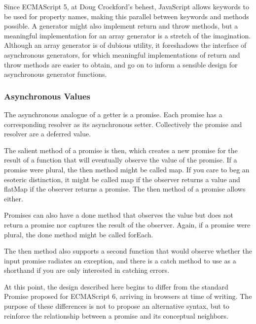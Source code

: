Since ECMAScript 5, at Doug Crockford’s behest, JavaScript allows keywords to be used for property names, making this parallel between keywords and methods possible. A generator might also implement return and throw methods, but a meaningful implementation for an array generator is a stretch of the imagination. Although an array generator is of dubious utility, it foreshadows the interface of asynchronous generators, for which meaningful implementations of return and throw methods are easier to obtain, and go on to inform a sensible design for asynchronous generator functions.

\subsubsection{Asynchronous Values}


The asynchronous analogue of a getter is a promise. Each promise has a corresponding resolver as its asynchronous setter. Collectively the promise and resolver are a deferred value.

The salient method of a promise is then, which creates a new promise for the result of a function that will eventually observe the value of the promise. If a promise were plural, the then method might be called map. If you care to beg an esoteric distinction, it might be called map if the observer returns a value and flatMap if the observer returns a promise. The then method of a promise allows either.

Promises can also have a done method that observes the value but does not return a promise nor captures the result of the observer. Again, if a promise were plural, the done method might be called forEach.

The then method also supports a second function that would observe whether the input promise radiates an exception, and there is a catch method to use as a shorthand if you are only interested in catching errors.

At this point, the design described here begins to differ from the standard Promise proposed for ECMAScript 6, arriving in browsers at time of writing. The purpose of these differences is not to propose an alternative syntax, but to reinforce the relationship between a promise and its conceptual neighbors.

